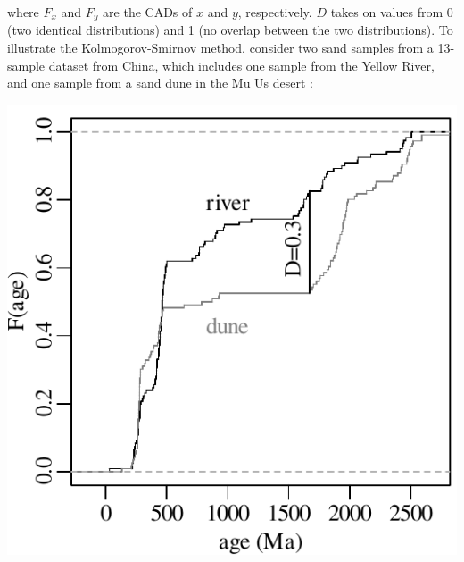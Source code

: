 \begin{refsection}
\noindent where $F_x$ and $F_y$ are the CADs of $x$ and $y$,
respectively.  $D$ takes on values from 0 (two identical
distributions) and 1 (no overlap between the two distributions). To
illustrate the Kolmogorov-Smirnov method, consider two sand samples
from a 13-sample dataset from China, which includes one sample from
the Yellow River, and one sample from a sand dune in the Mu Us desert
\citep{vermeesch2013}:

\noindent\begin{minipage}[t][][b]{.4\textwidth}
  \includegraphics[width=\textwidth]{../figures/KS.pdf}\\
\end{minipage}
\begin{minipage}[t][][t]{.6\textwidth}
  \label{fig:KS}
\end{minipage}


\end{refsection}
